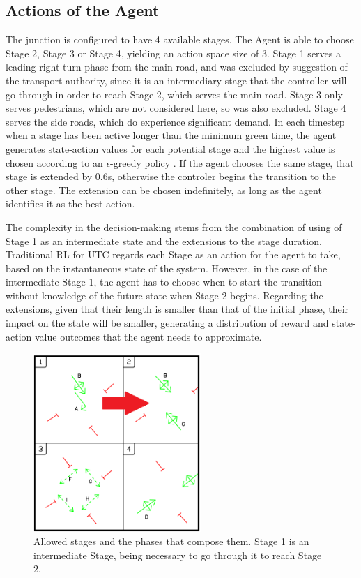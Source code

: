 \documentclass[conference]{IEEEtran}
\begin{document}
\subsection{Actions of the Agent}
The junction is configured to have 4 available stages. 
The Agent is able to choose Stage 2, Stage 3 or Stage 4, yielding an action space size of 3.
Stage 1 serves a leading right turn phase from the main road, and was excluded by suggestion of the transport authority, since it is an intermediary stage that the controller will go through in order to reach Stage 2, which serves the main road.
Stage 3 only serves pedestrians, which are not considered here, so was also excluded.
Stage 4 serves the side roads, which do experience significant demand.
In each timestep when a stage has been active longer than the minimum green time, the agent generates state-action values for each potential stage and the highest value is chosen according to an $\epsilon$-greedy policy \cite{suttonbarto}. If the agent chooses the same stage, that stage is extended by 0.6s, otherwise the controler begins the transition to the other stage.
The extension can be chosen indefinitely, as long as the agent identifies it as the best action.

The complexity in the decision-making stems from the combination of using of Stage 1 as an intermediate state and the extensions to the stage duration.
Traditional RL for UTC regards each Stage as an action for the agent to take, based on the instantaneous state of the system.
However, in the case of the intermediate Stage 1, the agent has to choose when to start the transition without knowledge of the future state when Stage 2 begins.
Regarding the extensions, given that their length is smaller than that of the initial phase, their impact on the state will be smaller, generating a distribution of reward and state-action value outcomes that the agent needs to approximate.
\begin{figure}                                                
\centering                                                    
\includegraphics[width=2.5in]{phases_limited.png}                                    
\caption{Allowed stages and the phases that compose them. Stage 1 is an intermediate Stage, being necessary to go through it to reach Stage 2.}                                  
\label{intersection}                                               
\end{figure}     
\end{document}
